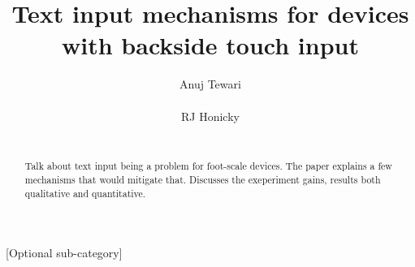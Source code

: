\documentclass{chi2011}
\begin{document}
\setlength{\paperheight}{11in}
\setlength{\paperwidth}{8.5in}
\setlength{\pdfpageheight}{\paperheight}
\setlength{\pdfpagewidth}{\paperwidth}


\title{Text input mechanisms for devices with backside touch input}
\author{
  \alignauthor Anuj Tewari\\
    \\
  \alignauthor RJ Honicky\\
    \\
}

\maketitle

\begin{abstract}
  Talk about text input being a problem for foot-scale devices. The paper explains a few mechanisms that would mitigate that. Discusses the exeperiment gains, results both qualitative and quantitative.
\end{abstract}


[Optional sub-category]





















\end{document}
